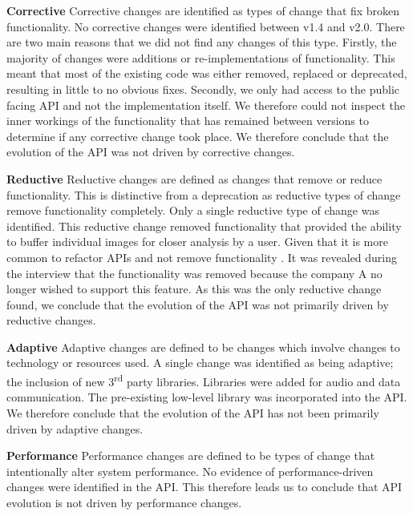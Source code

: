 \documentclass{sig-alternate}
\begin{document}
\smallskip \noindent
\textbf{Corrective  }
Corrective changes are identified as types of change that fix broken functionality.
No corrective changes were identified between v1.4 and v2.0. There are two main reasons that we did not find any changes of this type. Firstly, the majority of changes were additions or re-implementations of functionality. This meant that most of the existing code was either removed, replaced or deprecated, resulting in little to no obvious fixes. Secondly, we only had access to the public facing API and not the implementation itself. We therefore could not inspect the inner workings of the functionality that has remained between versions to determine if any corrective change took place.
We therefore conclude that the evolution of the API was not driven by corrective changes.

\newpage
\smallskip \noindent
\textbf{Reductive  }
Reductive changes are defined as changes that remove or reduce functionality. This is distinctive from a deprecation as reductive types of change remove functionality completely.
Only a single reductive type of change was identified. This reductive change removed functionality that provided the ability to buffer individual images for closer analysis by a user. Given that it is more common to refactor APIs and not remove functionality \cite{dig2005role, xing2006refactoring}. It was revealed during the interview that the functionality was removed because the company A no longer wished to support this feature. 
As this was the only reductive change found, we conclude that the evolution of the API was not primarily driven by reductive changes.

\smallskip \noindent
\textbf{Adaptive  }
Adaptive changes are defined to be changes which involve changes to technology or resources used. 
A single change was identified as being adaptive; the inclusion of new 3\textsuperscript{rd} party libraries. Libraries were added for audio and data communication. The pre-existing low-level library was incorporated into the API.
We therefore conclude that the evolution of the API has not been primarily driven by adaptive changes.

\smallskip \noindent
\textbf{Performance  }
Performance changes are defined to be types of change that intentionally alter system performance.
No evidence of performance-driven changes were identified in the API.
This therefore leads us to conclude that API evolution is not driven by performance changes.
\end{document}
